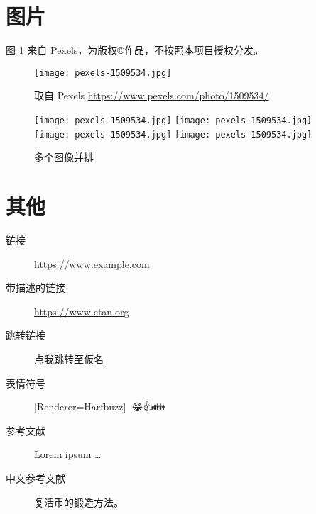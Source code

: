 \documentclass[
  fontset = none,
  punct   = kaiming,
]{ctexart}
\newcommand{\emoji}[1]{
  {\setmainfont{Apple Color Emoji}[Renderer=Harfbuzz]{#1}}
}
\let\oldurl\url
\renewcommand{\url}[1]{%
{\lmmono\oldurl{#1}}
}
\begin{document}
\newpage
\section{图片}

图 \ref{fig:example} 来自 Pexels，为版权\copyright{}作品，不按照本项目授权分发。

\begin{figure}[htbp]
  \centering
  \texttt{[image: pexels-1509534.jpg]}
  \caption{取自 Pexels \url{https://www.pexels.com/photo/1509534/}}
  \label{fig:example}
\end{figure}

\begin{figure}[htbp]
\centering
\texttt{[image: pexels-1509534.jpg]}
\texttt{[image: pexels-1509534.jpg]}
\\[\smallskipamount]
\texttt{[image: pexels-1509534.jpg]}
\texttt{[image: pexels-1509534.jpg]}
\caption{多个图像并排}
\end{figure}


\newpage
\section{其他}

\sans

\begin{description}
  \item[链接] \url{https://www.example.com}
  \item[带描述的链接] \href{CTAN}{https://www.ctan.org}
  \item[跳转链接]
    \hyperref[sec:kana]{点我跳转至{\gothic{}仮名}}
  \item[表情符号] \emoji{😶‍🌫️😂👍👪}
  \item[参考文献] Lorem ipsum \ldots \autocite{greenwade93}
  \item[中文参考文献] 复活币的锻造方法。 \autocite{bili_lex}
\end{description}

\printbibliography[heading=bibintoc]
\end{document}
